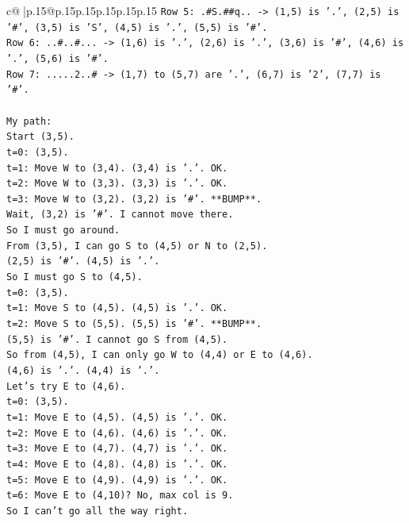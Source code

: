 \documentclass{article}
\begin{document}
{\begin{supertabular}{c@{$\;$}|p{.15\linewidth}@{}p{.15\linewidth}p{.15\linewidth}p{.15\linewidth}p{.15\linewidth}p{.15\linewidth}}
{{{\texttt{Row 5: .\#S.\#\#q.. {-}> (1,5) is '.', (2,5) is '\#', (3,5) is 'S', (4,5) is '.', (5,5) is '\#'.} \\
\texttt{Row 6: ..\#..\#... {-}> (1,6) is '.', (2,6) is '.', (3,6) is '\#', (4,6) is '.', (5,6) is '\#'.} \\
\texttt{Row 7: .....2..\# {-}> (1,7) to (5,7) are '.', (6,7) is '2', (7,7) is '\#'.} \\
\\ 
\texttt{My path:} \\
\texttt{Start (3,5).} \\
\texttt{t=0: (3,5).} \\
\texttt{t=1: Move W to (3,4). (3,4) is '.'. OK.} \\
\texttt{t=2: Move W to (3,3). (3,3) is '.'. OK.} \\
\texttt{t=3: Move W to (3,2). (3,2) is '\#'. **BUMP**.} \\
\texttt{Wait, (3,2) is '\#'. I cannot move there.} \\
\texttt{So I must go around.} \\
\texttt{From (3,5), I can go S to (4,5) or N to (2,5).} \\
\texttt{(2,5) is '\#'. (4,5) is '.'.} \\
\texttt{So I must go S to (4,5).} \\
\texttt{t=0: (3,5).} \\
\texttt{t=1: Move S to (4,5). (4,5) is '.'. OK.} \\
\texttt{t=2: Move S to (5,5). (5,5) is '\#'. **BUMP**.} \\
\texttt{(5,5) is '\#'. I cannot go S from (4,5).} \\
\texttt{So from (4,5), I can only go W to (4,4) or E to (4,6).} \\
\texttt{(4,6) is '.'. (4,4) is '.'.} \\
\texttt{Let's try E to (4,6).} \\
\texttt{t=0: (3,5).} \\
\texttt{t=1: Move E to (4,5). (4,5) is '.'. OK.} \\
\texttt{t=2: Move E to (4,6). (4,6) is '.'. OK.} \\
\texttt{t=3: Move E to (4,7). (4,7) is '.'. OK.} \\
\texttt{t=4: Move E to (4,8). (4,8) is '.'. OK.} \\
\texttt{t=5: Move E to (4,9). (4,9) is '.'. OK.} \\
\texttt{t=6: Move E to (4,10)? No, max col is 9.} \\
\texttt{So I can't go all the way right.} \\
}}}
\end{supertabular}}
\end{document}
